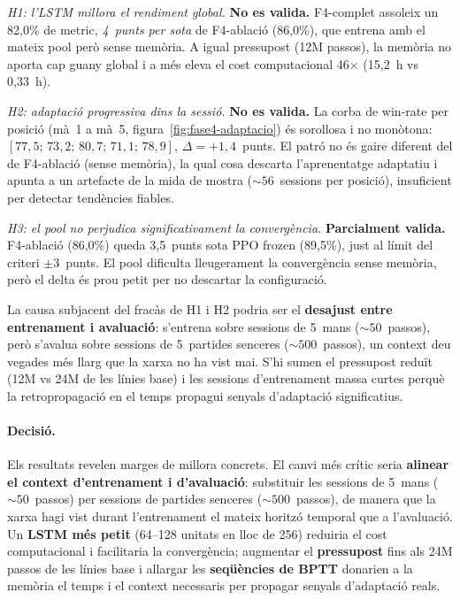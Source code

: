 \emph{H1: l'\ac{LSTM} millora el rendiment global.} \textbf{No es valida.}
F4-complet assoleix un 82{,}0\% de \(\text{metric}\), \emph{4~punts per sota} de F4-ablació
(86{,}0\%), que entrena amb el mateix pool però sense memòria. A igual pressupost (12M
passos), la memòria no aporta cap guany global i a més eleva el cost computacional 46$\times$
(15{,}2~h vs 0{,}33~h).

\emph{H2: adaptació progressiva dins la sessió.} \textbf{No es valida.}
La corba de win-rate per posició (mà~1 a mà~5, figura~\ref{fig:fase4-adaptacio}) és
sorollosa i no monòtona: $[77{,}5;\,73{,}2;\,80{,}7;\,71{,}1;\,78{,}9]$,
$\Delta = +1{,}4$~punts. El patró no és gaire diferent del de F4-ablació (sense memòria),
la qual cosa descarta l'aprenentatge adaptatiu i apunta a un artefacte de la mida de
mostra (${\sim}56$~sessions per posició), insuficient per detectar tendències fiables.

\emph{H3: el pool no perjudica significativament la convergència.} \textbf{Parcialment
valida.} F4-ablació (86{,}0\%) queda 3{,}5~punts sota PPO frozen (89{,}5\%), just al
límit del criteri $\pm3$~punts. El pool dificulta lleugerament la convergència sense
memòria, però el delta és prou petit per no descartar la configuració.

La causa subjacent del fracàs de H1 i H2 podria ser el \textbf{desajust entre entrenament i
avaluació}: s'entrena sobre sessions de 5~mans (${\sim}50$~passos), però s'avalua sobre
sessions de 5~partides senceres (${\sim}500$~passos), un context deu vegades més llarg que
la xarxa no ha vist mai. S'hi sumen el pressupost reduït (12M vs 24M de les línies base)
i les sessions d'entrenament massa curtes perquè la retropropagació en el temps propagui
senyals d'adaptació significatius.

\paragraph{Decisió.} Els resultats revelen marges de millora concrets. El canvi més crític
seria \textbf{alinear el context d'entrenament i d'avaluació}: substituir les sessions de
5~mans (${\sim}50$~passos) per sessions de partides senceres (${\sim}500$~passos), de
manera que la xarxa hagi vist durant l'entrenament el mateix horitzó temporal que a
l'avaluació. Un \textbf{\ac{LSTM} més petit} (64--128 unitats en lloc de 256) reduiria
el cost computacional i facilitaria la convergència; augmentar el \textbf{pressupost} fins
als 24M passos de les línies base i allargar les \textbf{seqüències de BPTT} donarien a
la memòria el temps i el context necessaris per propagar senyals d'adaptació reals.

